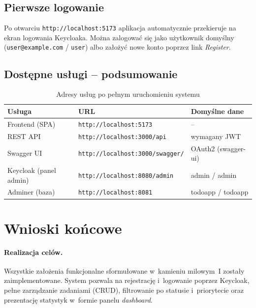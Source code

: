 \documentclass[12pt, a4paper, oneside]{article}
\begin{document}
\subsection{Pierwsze logowanie}
Po otwarciu \texttt{http://localhost:5173} aplikacja automatycznie
przekieruje na ekran logowania Keycloaka. Można zalogować się jako
użytkownik domyślny (\texttt{user@example.com} / \texttt{user})
albo założyć nowe konto poprzez link \emph{Register}.

\subsection{Dostępne usługi -- podsumowanie}
\begin{table}[H]
  \centering
  \begin{tabular}{@{}lll@{}}
    \toprule
    \textbf{Usługa}        & \textbf{URL}                            & \textbf{Domyślne dane} \\
    \midrule
    Frontend (SPA)         & \texttt{http://localhost:5173}          & --                     \\
    REST API               & \texttt{http://localhost:3000/api}      & wymagany JWT           \\
    Swagger UI             & \texttt{http://localhost:3000/swagger/} & OAuth2 (swagger-ui)    \\
    Keycloak (panel admin) & \texttt{http://localhost:8080/admin}    & admin / admin          \\
    Adminer (baza)         & \texttt{http://localhost:8081}          & todoapp / todoapp      \\
    \bottomrule
  \end{tabular}
  \caption{Adresy usług po pełnym uruchomieniu systemu}
\end{table}

\section{Wnioski końcowe}

\paragraph{Realizacja celów.}
Wszystkie założenia funkcjonalne sformułowane w~kamieniu milowym~I
zostały zaimplementowane. System pozwala na rejestrację i~logowanie
poprzez Keycloak, pełne zarządzanie zadaniami (CRUD), filtrowanie
po statusie i~priorytecie oraz prezentację statystyk w~formie panelu
\emph{dashboard}.
\end{document}
